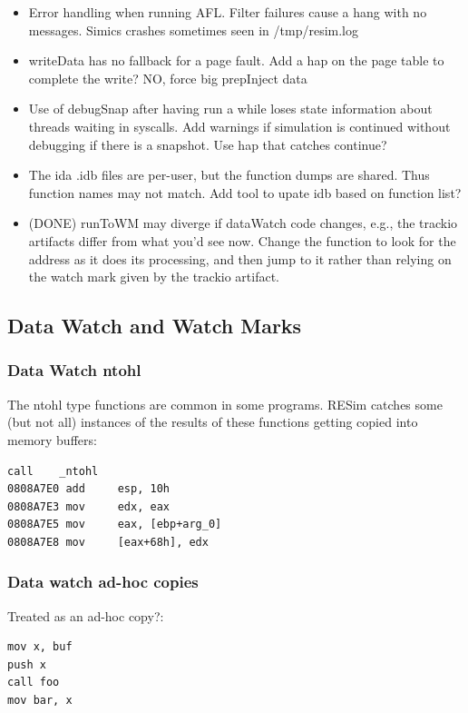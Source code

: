 \documentclass[titlepage]{article}
\begin{document}
\begin{appendices}
\begin{itemize}
\item Error handling when running AFL.  Filter failures cause a hang with no messages.  Simics crashes sometimes seen in /tmp/resim.log

\item writeData has no fallback for a page fault.  Add a hap on the page table to complete the write?  NO, force big prepInject data

\item Use of debugSnap after having run a while loses state information about threads waiting in syscalls.  Add warnings if simulation is
continued without debugging if there is a snapshot.  Use hap that catches continue?

\item The ida .idb files are per-user, but the function dumps are shared.  Thus function names may not match.  Add tool to upate idb based
on function list?

\item (DONE) runToWM may diverge if dataWatch code changes, e.g., the trackio artifacts differ from what you'd see now.  Change the function to
look for the address as it does its processing, and then jump to it rather than relying on the watch mark  given by the trackio artifact.
\end{itemize}

\subsection{Data Watch and Watch Marks}
\subsubsection{Data Watch ntohl}
The ntohl type functions are common in some programs.  RESim catches some (but not all) instances of the results of these functions getting copied into memory buffers:
\begin{verbatim}
call    _ntohl
0808A7E0 add     esp, 10h
0808A7E3 mov     edx, eax
0808A7E5 mov     eax, [ebp+arg_0]
0808A7E8 mov     [eax+68h], edx
\end{verbatim}

\subsubsection{Data watch ad-hoc copies}
Treated as an ad-hoc copy?:
\begin{verbatim}
mov x, buf
push x
call foo
mov bar, x
\end{verbatim}


\end{appendices}
\end{document}
